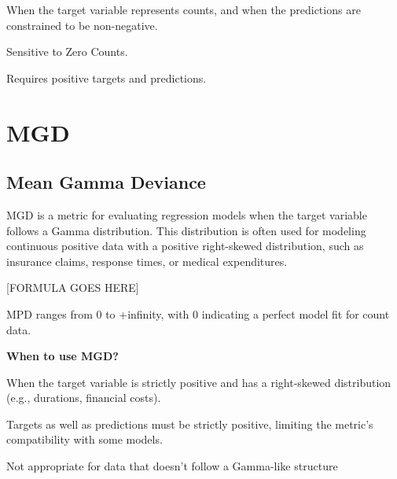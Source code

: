 When the target variable represents counts, and when the predictions are constrained to be non-negative.

{
    \item Sensitive to Zero Counts.
    \item Requires positive targets and predictions.
}

\clearpage
\thispagestyle{regressionstyle}
\section{MGD}
\subsection{Mean Gamma Deviance}

MGD is a metric for evaluating regression models when the target variable follows a Gamma distribution. This distribution is often used for modeling continuous positive data with a
positive right-skewed distribution, such as insurance claims, response times, or medical expenditures.

\begin{center}
    [FORMULA GOES HERE]
\end{center}

MPD ranges from 0 to +infinity, with 0 indicating a perfect model fit for count data.

\textbf{When to use MGD?}

When the target variable is strictly positive and has a right-skewed distribution (e.g., durations, financial costs).

{
    \item Targets as well as predictions must be strictly positive, limiting the metric’s compatibility with some models.
    \item Not appropriate for data that doesn't follow a Gamma-like structure
}


